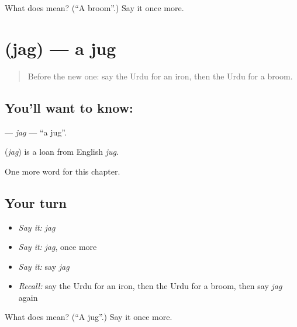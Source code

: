 \begin{tcolorbox}[breakable,colback=teal!4,colframe=teal!35!black,title={Before you move on}]
What does  mean? (\textquotedblleft{}A broom\textquotedblright{}.) Say it once more.
\end{tcolorbox}
\section[\texorpdfstring{\ur{جگ} (jag)}{جگ (jag)}]{ (jag) — a jug}

\label{lesson:UR-C224-jag}



\begin{quote}
Before the new one: say the Urdu for an iron, then the Urdu for a broom.
\end{quote}

\subsection*{You'll want to know: }
\textbf{} — \emph{jag} — \textquotedblleft{}a jug\textquotedblright{}.

\begin{cousinweb}
\textbf{} (\emph{jag}) is a loan from English \emph{jug}.
\end{cousinweb}

\begin{grammarlens}[title={What you've built}]
One more word for this chapter.
\end{grammarlens}

\subsection*{Your turn}
\begin{itemize}
\raggedright
  \item \emph{Say it:} \emph{jag}
  \item \emph{Say it:} \emph{jag}, once more
  \item \emph{Say it:} say \emph{jag}
  \item \emph{Recall:} say the Urdu for an iron, then the Urdu for a broom, then say \emph{jag} again
\end{itemize}

\begin{tcolorbox}[breakable,colback=teal!4,colframe=teal!35!black,title={Before you move on}]
What does  mean? (\textquotedblleft{}A jug\textquotedblright{}.) Say it once more.
\end{tcolorbox}
